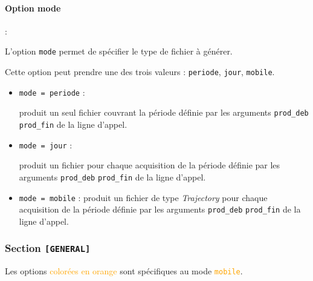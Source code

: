 \paragraph{Option mode} : \label{ref:mode}

L'option \texttt{mode} permet de spécifier le type de fichier
\netcdf à générer.
\medbreak

Cette option peut prendre une des trois valeurs : \texttt{periode},
\texttt{jour}, \texttt{mobile}.

\begin{itemize}
\item
  \texttt{mode = periode} :

    \prodcdf produit un seul fichier \netcdf couvrant la période définie par
    les arguments \texttt{prod\_deb} \texttt{prod\_fin} de la ligne d'appel.

\item
  \texttt{mode = jour} :
    
    \prodcdf produit un fichier \netcdf pour chaque acquisition de la période
    définie par les arguments \texttt{prod\_deb} \texttt{prod\_fin} de la ligne
    d'appel.

\item
  \texttt{mode = mobile} :
    \prodcdf produit un fichier \netcdf de type \textit{Trajectory} pour chaque
    acquisition de la période définie par les arguments \texttt{prod\_deb}
    \texttt{prod\_fin} de la ligne d'appel.
\end{itemize}

\subsubsection{Section \texttt{[GENERAL]}}

Les options \textcolor{orange}{colorées en orange} sont spécifiques au mode
\textcolor{orange}{\texttt{mobile}}.

